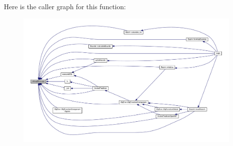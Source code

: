 Here is the caller graph for this function\-:
\nopagebreak
\begin{figure}[H]
\begin{center}
\leavevmode
\includegraphics[width=350pt]{debugmessage_8hh_a7216d8ca989b1eaea79109c2a1236024_icgraph}
\end{center}
\end{figure}


